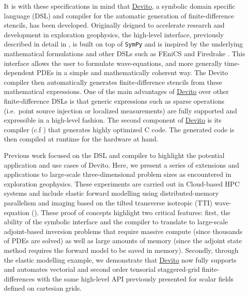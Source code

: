 \documentclass[conference]{IEEEtran}
\begin{document}
It is with these specifications in mind that
\href{https://github.com/devitocodes/devito}{Devito}, a symbolic domain
specific language (DSL) and compiler for the automatic generation of
finite-difference stencils, has been developed. Originally deigned to
accelerate research and development in exploration geophysics, the high-level
interface, previously described in detail in \cite{devito-api}, is built on top
of \texttt{SymPy} \cite{sympy} and is inspired by the underlying mathematical
formulations and other DSLs such as FEniCS \cite{fenics} and Firedrake
\cite{firedrake}. This interface allows the user to formulate wave-equations,
and more generally time-dependent PDEs in a simple and mathematically coherent
way. The Devito compiler then automatically generates finite-difference
stencils from these mathematical expressions. One of the main advantages of
\href{https://github.com/devitocodes/devito}{Devito} over other
finite-difference DSLs is that generic expressions such as sparse operations
(i.e.~point source injection or localized measurements) are fully supported and
expressible in a high-level fashion. The second component of
\href{https://github.com/devitocodes/devito}{Devito} is its compiler (c.f
\cite{devito-compiler}) that generates highly optimized C code. The generated
code is then compiled at runtime for the hardware at hand.

Previous work focused on the DSL and compiler to highlight the potential
application and use cases of Devito. Here, we present a series of
extensions and applications to large-scale three-dimensional problem
sizes as encountered in exploration geophysics. These experiments are
carried out in Cloud-based HPC systems and include elastic forward
modelling using distributed-memory parallelism and imaging based on the
tilted transverse isotropic (TTI) wave-equation
(\cite{virieux, thomsen1986, zhang-tti, duveneck, louboutin2018segeow}).
These proof of concepts highlight two critical features: first, the
ability of the symbolic interface and the compiler to translate to
large-scale adjoint-based inversion problems that require massive
compute (since thousands of PDEs are solved) as well as large amounts of
memory (since the adjoint state method requires the forward model to be
saved in memory). Secondly, through the elastic modelling example, we
demonstrate that \href{https://github.com/devitocodes/devito}{Devito}
now fully supports and automates vectorial and second order tensorial
staggered-grid finite-differences with the same high-level API
previously presented for scalar fields defined on cartesian grids.
\end{document}
